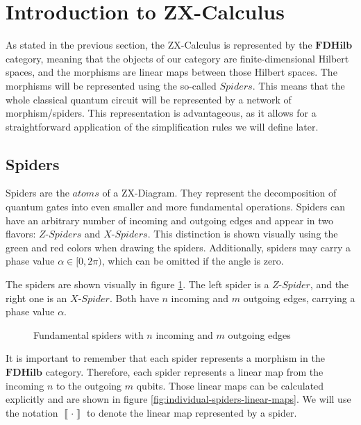 \section{Introduction to ZX-Calculus}

As stated in the previous section, the ZX-Calculus is represented by the
$\mathbf{FDHilb}$ category, meaning that the objects of our category are finite-dimensional Hilbert spaces, and the morphisms are linear maps between those Hilbert spaces. The morphisms will be represented using the so-called $\textit{Spiders}$. This means that the whole classical quantum circuit will be represented by a network of morphism/spiders. This representation is advantageous, as it allows for a straightforward application of the simplification rules we will define later.

\subsection{Spiders}

Spiders are the $\textit{atoms}$ of a ZX-Diagram. They represent the decomposition of quantum gates into even smaller and more fundamental operations.
Spiders can have an arbitrary number of incoming and outgoing edges and appear in two flavors: $\textit{Z-Spiders}$ and $\textit{X-Spiders}$. This distinction is shown visually using the green and red colors when drawing the spiders.
Additionally, spiders may carry a phase value $\alpha \in [0, 2\pi)$, which can be omitted if the angle is zero.

The spiders are shown visually in figure \ref{fig:spiders-visual}. The left spider is a $\textit{Z-Spider}$, and the right one is an $\textit{X-Spider}$. Both have $n$ incoming and $m$ outgoing edges, carrying a phase value $\alpha$.

\begin{figure}[h]
    \centering
    \begin{ZX}
          \zxZ{\alpha} 
    \end{ZX}
    \begin{ZX}
          \zxX{\alpha} 
    \end{ZX}
    \caption{Fundamental spiders with $n$ incoming and $m$ outgoing edges}
    \label{fig:spiders-visual}
\end{figure}


It is important to remember that each spider represents a morphism in the $\mathbf{FDHilb}$ category. Therefore, each spider represents a linear map from the incoming $n$ to the outgoing $m$ qubits. Those linear maps can be calculated explicitly and are shown in figure \ref{fig:individual-spiders-linear-maps}. We will use the notation $\left \llbracket \cdot \right \rrbracket$ to denote the linear map represented by a spider.

